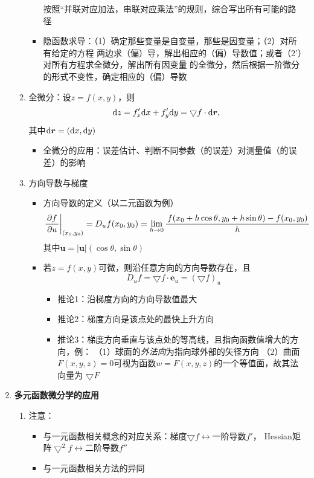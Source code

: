 \begin{enumerate}
\begin{enumerate}[(1)]
\begin{itemize}
      按照“并联对应加法，串联对应乘法”的规则，综合写出所有可能的路径
      \item 隐函数求导：（1）确定那些变量是自变量，那些是因变量；（2）对所有给定的方程
      两边求（偏）导，解出相应的（偏）导数值；或者（2'）对所有方程求全微分，解出所有因变量
      的全微分，然后根据一阶微分的形式不变性，确定相应的（偏）导数
    \end{itemize}
    \item 全微分：设$z=f(x,y)$，则
    $$\mathrm{d} z=f'_x\mathrm{d} x+f'_y\mathrm{d} y=\bigtriangledown f\cdot \mathrm{d}\bm{r},$$
    其中$\mathrm{d}\bm{r}=(\mathrm{d} x,\mathrm{d} y)$
    \begin{itemize}
      \item 全微分的应用：误差估计、判断不同参数（的误差）对测量值（的误差）的影响
    \end{itemize}
    \item 方向导数与梯度
    \begin{itemize}
      \item 方向导数的定义（以二元函数为例）
      $$\left.\displaystyle\frac{\,{\partial f}\,}{\,{\partial u}\,}\right|_{(x_0,y_0)}=D_uf(x_0,y_0)
      =\lim\limits_{h\to0}\displaystyle\frac{\,{f(x_0+h\cos\theta,y_0+h\sin\theta)-
      f(x_0,y_0)}\,}{\,{h}\,}$$
      其中$\bm{u}=|\bm{u}|(\cos\theta,\sin\theta)$
      \item 若$z=f(x,y)$可微，则沿任意方向的方向导数存在，且
      $$D_uf=\bigtriangledown f\cdot\bm{e}_u=\left(\bigtriangledown f\right)_u$$
      \begin{itemize}
        \item 推论1：沿梯度方向的方向导数值最大
        \item 推论2：梯度方向是该点处的最快上升方向
        \item 推论3：梯度方向垂直与该点处的等高线，且指向函数值增大的方向，例：
        （1）球面的{\it 外法向}为指向球外部的矢径方向
        （2）曲面$F(x,y,z)=0$可视为函数$w=F(x,y,z)$的一个等值面，故其法向量为 
        $\bigtriangledown F$
      \end{itemize}
    \end{itemize}
  \end{enumerate}
  \item {\bf 多元函数微分学的应用}
  \begin{enumerate}[(1)]
    \item 注意：
    \begin{itemize}
      \item 与一元函数相关概念的对应关系：梯度$\bigtriangledown f\leftrightarrow$一阶导数$f'$，
      Hessian矩阵$\bigtriangledown^2f\leftrightarrow$二阶导数$f''$
      \item 与一元函数相关方法的异同 

\end{itemize}
\end{enumerate}
\end{enumerate}
